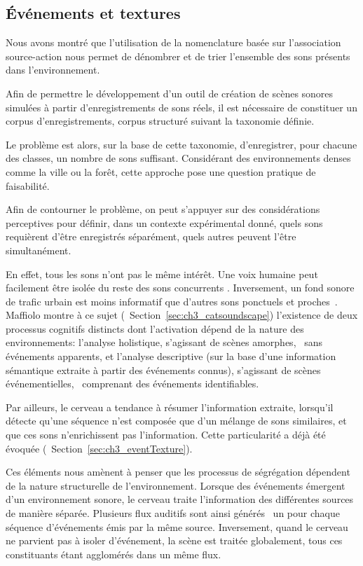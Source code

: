\subsection{Événements et textures}
\label{sec:ch4_eventTextureAmorphe}

Nous avons montré que l'utilisation de la nomenclature basée sur l’association source-action nous permet de dénombrer et de trier l'ensemble des sons présents dans l'environnement.

Afin de permettre le développement d'un outil de création de scènes sonores simulées à partir d'enregistrements de sons réels, il est nécessaire de constituer un corpus d'enregistrements, corpus structuré suivant la taxonomie définie. 

Le problème est alors, sur la base de cette taxonomie, d'enregistrer, pour chacune des classes, un nombre de sons suffisant. Considérant des environnements denses comme la ville ou la forêt, cette approche pose une question pratique de faisabilité.

Afin de contourner le problème, on peut s’appuyer sur des considérations perceptives pour définir, dans un contexte expérimental donné, quels sons requièrent d'être enregistrés séparément, quels autres peuvent l'être simultanément.

En effet, tous les sons n'ont pas le même intérêt. Une voix humaine peut facilement être isolée du reste des sons concurrents \citep{carlyon2004brain}. Inversement, un fond sonore de trafic urbain est moins informatif que d'autres sons ponctuels et proches~\citep{southworth1969sonic}.
Maffiolo montre à ce sujet (\cf~Section~\ref{sec:ch3_catsoundscape}) l'existence de deux processus cognitifs distincts dont l'activation dépend de la nature des environnements: l'analyse holistique, s'agissant de scènes amorphes, \ie~sans événements apparents, et l'analyse descriptive (sur la base d'une information sémantique extraite à partir des événements connus), s'agissant de scènes événementielles, \ie~comprenant des événements identifiables.

Par ailleurs, le cerveau a tendance à résumer l'information extraite, lorsqu'il détecte qu'une séquence n'est composée que d'un mélange de sons similaires, et que ces sons n'enrichissent pas l'information. Cette particularité a déjà été évoquée (\cf~Section~\ref{sec:ch3_eventTexture}). 

Ces éléments nous amènent à penser que les processus de ségrégation dépendent de la nature structurelle de l'environnement. Lorsque des événements émergent d'un environnement sonore, le cerveau traite l'information des différentes sources de manière séparée. Plusieurs flux auditifs sont ainsi générés \ie~un pour chaque séquence d'événements émis par la même source. Inversement, quand le cerveau ne parvient pas à isoler d'événement, la scène est traitée globalement, tous ces constituants étant agglomérés dans un même flux.

